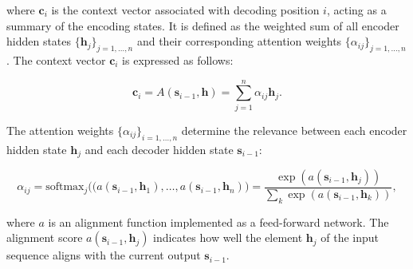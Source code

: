 \noindent where $\bm{c}_i$ is the context vector associated with decoding position $i$, acting as a summary of the encoding states. It is defined as the weighted sum of all encoder hidden states $\{\bm{h}_j\}_{j=1, \ldots, n}$ and their corresponding attention weights $\{\alpha_{ij}\}_{j=1, \ldots, n}$. The context vector $\bm{c}_i$ is expressed as follows:


\begin{equation}
    \bm{c}_i = A(\bm{s}_{i-1}, \bm{h}) = \sum_{j=1}^n \alpha_{ij} \bm{h}_j.
\end{equation}

\noindent The attention weights $\{\alpha_{ij}\}_{i=1, \ldots, n}$ determine the relevance between each encoder hidden state $\bm{h}_j$ and each decoder hidden state $\bm{s}_{i-1}$:


\begin{equation}
    \alpha_{ij} = \textrm{softmax}_j\bigl((a(\bm{s}_{i-1}, \bm{h}_1), \ldots, a(\bm{s}_{i-1}, \bm{h}_n)\bigr) = \frac{\exp(a(\bm{s}_{i-1}, \bm{h}_j))}{\sum_k \exp(a(\bm{s}_{i-1}, \bm{h}_k))},
\end{equation}


\noindent where $a$ is an alignment function implemented as a feed-forward network. The alignment score $a(\bm{s}_{i-1}, \bm{h}_j)$ indicates how well the element $\bm{h}_j$ of the input sequence aligns with the current output $\bm{s}_{i-1}$. 

